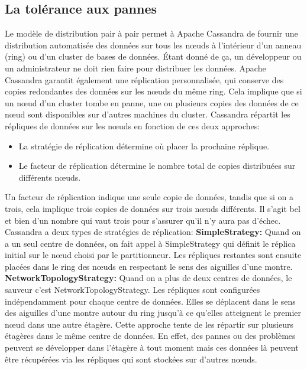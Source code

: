 \documentclass[12pt, letterpaper]{report}
\begin{document}
\subsection{La tolérance aux pannes}
\justifying
Le modèle de distribution pair à pair permet à Apache Cassandra de fournir une distribution automatisée des données sur tous les nœuds à l'intérieur d'un anneau (ring) ou d'un cluster de bases de données. Étant donné de ça, un développeur ou un administrateur ne doit rien faire pour distribuer les données. 
\newline
Apache Cassandra garantit également une réplication personnalisée, qui conserve des copies redondantes des données sur les nœuds du même ring. Cela implique que si un nœud d'un cluster tombe en panne, une ou plusieurs copies des données de ce nœud sont disponibles sur d'autres machines du cluster.
\newline 
Cassandra répartit les répliques de données sur les nœuds en fonction de ces deux approches:
\begin{itemize}
  \item La stratégie de réplication détermine où placer la prochaine réplique.
  \item Le facteur de réplication détermine le nombre total de copies distribuées sur différents nœuds.
\end{itemize}  
\justifying
Un facteur de réplication indique une seule copie de données, tandis que si on a trois, cela implique trois copies de données sur trois nœuds différents. Il s’agit bel et bien d’un nombre qui vaut trois pour s'assurer qu'il n'y aura pas d’échec.
\newline 
Cassandra a deux types de stratégies de réplication:
\newline
\justifying
\textbf{SimpleStrategy: }
\newline
\justifying
Quand on a un seul centre de données, on fait appel à SimpleStrategy qui définit le réplica initial sur le nœud choisi par le partitionneur. Les répliques restantes sont ensuite placées dans le ring des nœuds en respectant le sens des aiguilles d'une montre.
\textbf{NetworkTopologyStrategy: }
\newline
\justifying
Quand on a plus de deux centres de données, le sauveur c’est NetworkTopologyStrategy.
\newline
Les répliques sont configurées indépendamment pour chaque centre de données. Elles se déplacent dans le sens des aiguilles d'une montre autour du ring jusqu'à ce qu'elles atteignent le premier nœud dans une autre étagère. 
\newline
Cette approche tente de les répartir sur plusieurs étagères dans le même centre de données. En effet, des pannes ou des problèmes peuvent se développer dans l’étagère à tout moment mais ces données là peuvent être récupérées via les répliques qui sont stockées sur d'autres nœuds.
\end{document}

